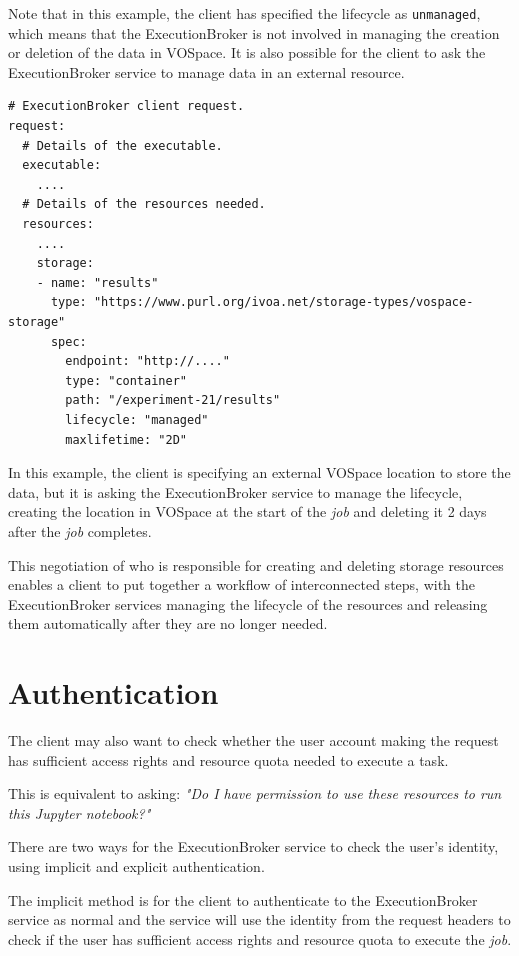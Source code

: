 \documentclass[11pt,a4paper]{ivoa}
\newcommand{\vospace} {VOSpace}
\newcommand{\execbrokerclass} {ExecutionBroker}
\newcommand{\jupyternotebook} {Jupyter notebook}
\newcommand{\codeword}[1] {\texttt{#1}}
\newcommand{\job} {\textit{job}}
\newcommand{\task} {task}
\begin{document}
Note that in this example, the client has specified the lifecycle as \codeword{unmanaged},
which means that the \execbrokerclass{} is not involved in managing the creation or deletion
of the data in \vospace.
It is also possible for the client to ask the \execbrokerclass{} service to manage
data in an external resource.

\begin{lstlisting}[]
# ExecutionBroker client request.
request:
  # Details of the executable.
  executable:
    ....
  # Details of the resources needed.
  resources:
    ....
    storage:
    - name: "results"
      type: "https://www.purl.org/ivoa.net/storage-types/vospace-storage"
      spec:
        endpoint: "http://...."
        type: "container"
        path: "/experiment-21/results"
        lifecycle: "managed"
        maxlifetime: "2D"
\end{lstlisting}

In this example, the client is specifying an external \vospace{} location to store the data,
but it is asking the \execbrokerclass{} service to manage the lifecycle, creating the location
in \vospace{} at the start of the \job{} and deleting it 2 days after the \job{} completes.

This negotiation of who is responsible for creating and deleting storage resources
enables a client to put together a workflow of interconnected steps, with the
\execbrokerclass{} services
managing the lifecycle of the resources and releasing them automatically after they
are no longer needed.

\section{Authentication}
\label{authentication}

The client may also want to check whether the user account making the request
has sufficient access rights and resource quota needed to execute a \task{}.

This is equivalent to asking:
\textit{"Do I have permission to use these resources to run this \jupyternotebook{}?"}

There are two ways for the \execbrokerclass{} service to check the user's identity,
using implicit and explicit authentication.

The implicit method is for the client to authenticate to the \execbrokerclass{} service
as normal and the service will use the identity from the request headers to check if the
user has sufficient access rights and resource quota to execute the \job{}.
\end{document}
